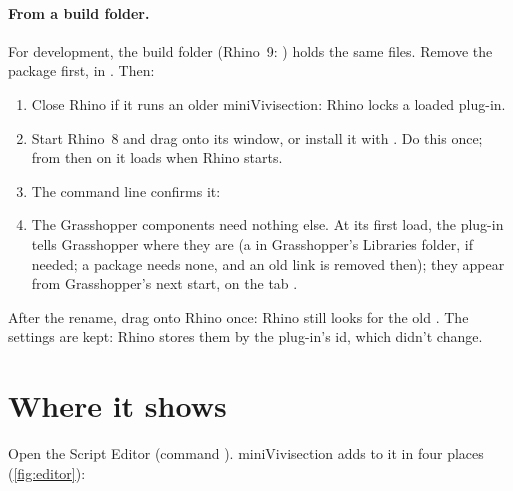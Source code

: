 \paragraph{From a build folder.} For development, the build folder  (Rhino~9: )
holds the same files. Remove the package first, in . Then:

\begin{enumerate}[label=\arabic*.]
  \item Close Rhino if it runs an older miniVivisection: Rhino locks a loaded plug-in.
  \item Start Rhino~8 and drag  onto its window, or install it with
        . Do this once; from then on it loads when Rhino starts.
  \item The command line confirms it:
  \item The Grasshopper components need nothing else. At its first load, the plug-in tells Grasshopper
        where they are (a  in Grasshopper's Libraries folder, if needed; a
        package needs none, and an old link is removed then); they appear from Grasshopper's next start,
        on the tab .
\end{enumerate}

\begin{note}
After the rename, drag  onto Rhino once: Rhino still looks for the old
. The settings are kept: Rhino stores them by the plug-in's id, which
didn't change.
\end{note}

\section{Where it shows}\label{sec:whereitshows}

Open the Script Editor (command ). miniVivisection adds to it in four places
(\cref{fig:editor}):

